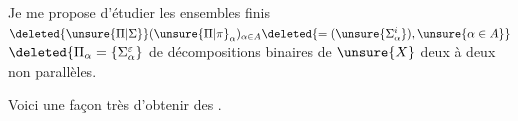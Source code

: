 Je me propose d'étudier les ensembles finis
$\deleted{\unsure{\Pi|\Sigma}}(\unsure{\Pi|\pi}_\alpha)_{\alpha\in A}
\deleted{=(\unsure{\Sigma_\alpha^i}),\unsure{\alpha\in A}}$
$\deleted{\Pi_\alpha=\{\Sigma_\alpha^\varepsilon}$
de décompositions binaires de $\unsure{X}$ deux à deux non parallèles.

Voici une façon très 
d'obtenir des .
